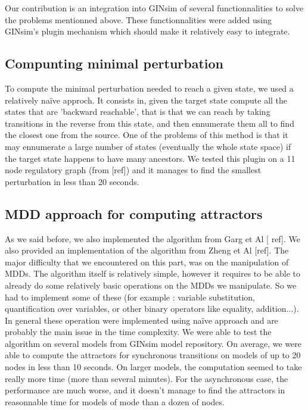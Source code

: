 \documentclass[a4paper,11pt]{article}
\begin{document}

Our contribution is an integration into GINsim of several functionnalities to solve the problems mentionned above. These functionnalities were added using GINsim's plugin mechanism which should make it relatively easy to integrate. 

\subsection{Compunting minimal perturbation}
To compute the minimal perturbation needed to reach a given state, we used a relatively naïve approch. It consists in, given the target state compute all the states that are 'backward reachable', that is that we can reach by taking transitions in the reverse from this state, and then ennumerate them all to find the closest one from the source. One of the problems of this method is that it may ennumerate a large number of states (eventually the whole state space) if the target state happens to have many ancestors. We tested this plugin on a 11 node regulatory graph (from [ref]) %
and it manages to find the smallest perturbation in less than 20 seconds.

\subsection{MDD approach for computing attractors}
As we said before, we also implemented the algorithm from Garg et Al [ ref]. %
We also provided an implementation of the algorithm from Zheng et Al [ref]. %
The major difficulty that we encountered on this part, was on the manipulation of MDDs. The algorithm itself is relatively simple, however it requires to be able to already do some relatively basic operations on the MDDs we manipulate. So we had to implement some of these (for example : variable substitution, quantification over variables, or other binary operators like equality, addition...). In general these operation were implemented using naïve approach and are probably the main issue in the time complexity. We were able to test the algorithm on several models from GINsim model repository. On average, we were able to compute the attractors for synchronous transitions on models of up to 20 nodes in less than 10 seconds. On larger models, the computation seemed to take really more time (more than several minutes). For the asynchronous case, the performance are much worse, and it doesn't manage to find the attractors in reasonnable time for models of mode than a dozen of nodes.
\end{document}
